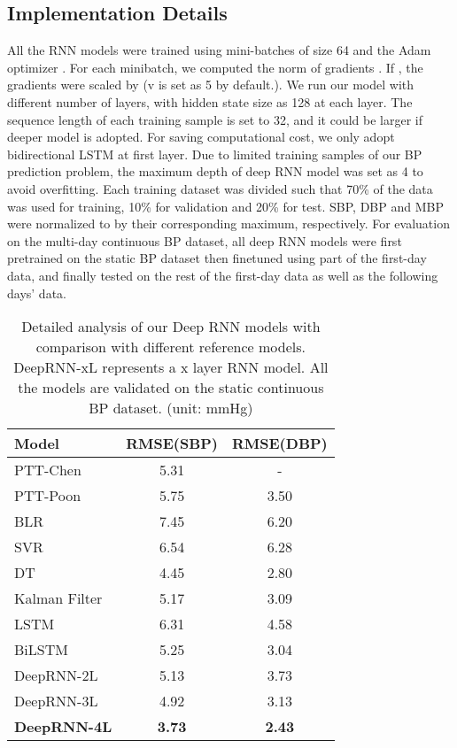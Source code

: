 \documentclass[letterpaper, 10 pt, conference]{ieeeconf}
\begin{document}
\subsection{Implementation Details}
All the RNN models were trained using mini-batches of size 64 and the Adam optimizer \cite{kingma2014adam}.
For each minibatch, we computed the norm of gradients . If   , the gradients were scaled by   (v is set as 5 by default.).
We run our model with different number of layers, with hidden state size as 128 at each layer.
The sequence length  of each training sample is set to 32, and it could be larger if deeper model is adopted.
For saving computational cost, we only adopt bidirectional LSTM at first layer.
Due to limited training samples of our BP prediction problem, 
the maximum depth of deep RNN model was set as 4 to avoid overfitting.
Each training dataset was divided such that 70\% of the data was used for training, 10\% for validation and 20\% for test. 
SBP, DBP and MBP were normalized to  by their corresponding maximum, respectively.
For evaluation on the multi-day continuous BP dataset,
all deep RNN models were first pretrained on the static BP dataset then finetuned using part of the first-day data, and finally tested on the rest of the first-day data as well as the following days' data.
\begin{table} 
  \centering  
  \begin{tabularx}{0.7\linewidth}{lcc}
    \toprule
    {\textbf{Model}} & {\textbf{RMSE(SBP)}} & {\textbf{RMSE(DBP)}}  \\ \midrule    \midrule           
    PTT-Chen \cite{chen2000continuous}   	   & 5.31	    & -       \\
    PTT-Poon \cite{poon2006cuff}       &   5.75    &   3.50	   \\   
    \midrule
    BLR      	&  7.45	   	  	& 	6.20  	\\
    SVR  	& 	6.54   	  &  6.28 	 \\
    DT  		&  	4.45	  	&    2.80 	 \\  
    \midrule
    Kalman Filter 	& 5.17  	  	& 3.09   \\
    \midrule
    LSTM 	  &  6.31    	& 4.58 \\
    BiLSTM 	   &  5.25    	  	&  3.04  \\
    DeepRNN-2L   &  5.13	 		& 3.73  \\
    DeepRNN-3L    &  4.92	 	& 3.13 \\
    \textbf{DeepRNN-4L} 
       &  \textbf{3.73}  	& \textbf{2.43}	   \\
  \bottomrule 
  \end{tabularx} 
   \caption{Detailed analysis of our Deep RNN models with comparison with different reference models. DeepRNN-xL represents a x layer RNN model. All the models are validated on the static continuous BP dataset. (unit: mmHg)}
   \label{tab:1dayNEW}
\end{table}
\end{document}
